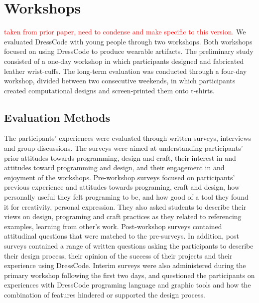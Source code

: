 \documentclass{sigchi}
\begin{document}
\section{Workshops}
\textcolor{red}{taken from prior paper, need to condense and make specific to this version.}
We evaluated DressCode with young people through two workshops. Both workshops focused on using DressCode to produce wearable artifacts. The preliminary study consisted of a one-day workshop in which participants designed and fabricated leather wrist-cuffs. The long-term evaluation was conducted through a four-day workshop, divided between two consecutive weekends, in which participants created computational designs and screen-printed them onto t-shirts. 

\subsection{Evaluation Methods}
The participants' experiences were evaluated through written surveys, interviews and group discussions. The surveys were aimed at understanding participants’ prior attitudes towards programming, design and craft, their interest in and attitudes toward programming and design, and their engagement in and enjoyment of the workshops. Pre-workshop surveys focused on participants’ previous experience and attitudes towards programing, craft and design, how personally useful they felt programing to be, and how good of a tool they found it for creativity, personal expression. They also asked students to describe their views on design, programing and craft practices as they related to referencing examples, learning from other's work. Post-workshop surveys contained attitudinal questions that were matched to the pre-surveys. In addition, post surveys contained a range of written questions asking the participants to describe their design process, their opinion of the success of their projects and their experience using DressCode. Interim surveys were also administered during the primary workshop following the first two days, and questioned the participants on experiences with DressCode programing language and graphic tools and how the combination of features hindered or supported the design process.
\end{document}
